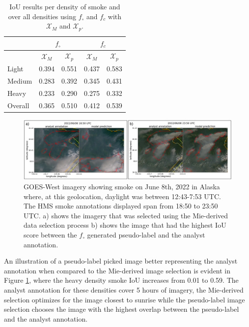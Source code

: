 \documentclass{article}
\begin{document}
\begin{table} 
    \caption{IoU results per density of smoke and over all densities using \(f_{\circ}\) and \(f_c\) with \(\mathcal{X}_M\) and \(\mathcal{X}_p\).}\label{iou_results}
    \centering
    \begin{tabular}{lcc|cc}
        \toprule
        \multicolumn{1}{c}{} & \multicolumn{2}{c}{\(f_{\circ}\)} & \multicolumn{2}{c}{\(f_c\)}\\
        \midrule
        \multicolumn{1}{c}{} & \(\mathcal{X}_M\) & \(\mathcal{X}_{p}\) & \(\mathcal{X}_M\) & \(\mathcal{X}_{p}\) \\
        \midrule
        Light  & 0.394 &  0.551 & 0.437 &  0.583 \\
        Medium & 0.283 &  0.392 & 0.345 &  0.431 \\
        Heavy  & 0.233 &  0.290 & 0.275 &  0.332 \\
        Overall & 0.365 &  0.510 & 0.412 &  0.539 \\
        \bottomrule
    \end{tabular}
\end{table}

\begin{figure}
    \centering
    \includegraphics[width=14cm]{figures/D_m_vs_D_pl.png}
    \caption{GOES-West imagery showing smoke on June 8th, 2022 in Alaska where, at this geolocation, daylight was between 12:43-7:53 UTC. The HMS smoke annotations displayed span from 18:50 to 23:50 UTC. a) shows the imagery that was selected using the Mie-derived data selection process b) shows the image that had the highest IoU score between the \(f_{\circ}\) generated pseudo-label and the analyst annotation.}\label{ml_vs_mei}
\end{figure}

An illustration of a pseudo-label picked image better representing the analyst annotation when compared to the Mie-derived image selection is evident in Figure \ref{ml_vs_mei}, where the heavy density smoke IoU increases from 0.01 to 0.59. The analyst annotation for these densities cover 5 hours of imagery, the Mie-derived selection optimizes for the image closest to sunrise while the pseudo-label image selection chooses the image with the highest overlap between the pseudo-label and the analyst annotation. 
\end{document}
